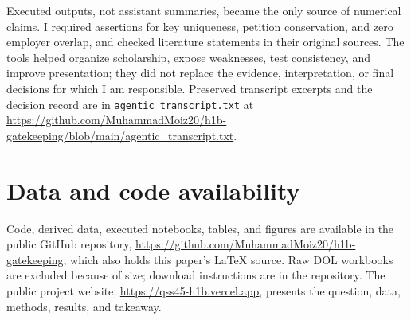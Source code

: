 \documentclass[9pt,twoside]{pnas-new}
\begin{document}
Executed outputs, not assistant summaries, became the only source of numerical claims. I required assertions for key uniqueness, petition conservation, and zero employer overlap, and checked literature statements in their original sources. The tools helped organize scholarship, expose weaknesses, test consistency, and improve presentation; they did not replace the evidence, interpretation, or final decisions for which I am responsible. Preserved transcript excerpts and the decision record are in \texttt{agentic\_transcript.txt} at \url{https://github.com/MuhammadMoiz20/h1b-gatekeeping/blob/main/agentic_transcript.txt}.

\section*{Data and code availability}

Code, derived data, executed notebooks, tables, and figures are available in the public GitHub repository, \url{https://github.com/MuhammadMoiz20/h1b-gatekeeping}, which also holds this paper's LaTeX source. Raw DOL workbooks are excluded because of size; download instructions are in the repository. The public project website, \url{https://qss45-h1b.vercel.app}, presents the question, data, methods, results, and takeaway.

\showacknow


\end{document}
